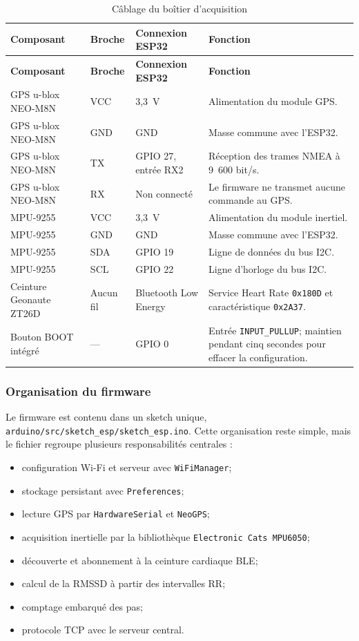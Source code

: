 \documentclass[11pt,a4paper]{article}
\newcommand{\code}[1]{\nolinkurl{#1}}
\begin{document}
\begin{longtable}{L{3.7cm}L{2.7cm}L{4.2cm}L{5.4cm}}
\caption{Câblage du boîtier d'acquisition}\label{tab:cablage-esp32}\\
\toprule
\textbf{Composant} & \textbf{Broche} & \textbf{Connexion ESP32} & \textbf{Fonction} \\
\midrule
\endfirsthead
\toprule
\textbf{Composant} & \textbf{Broche} & \textbf{Connexion ESP32} & \textbf{Fonction} \\
\midrule
\endhead
GPS u-blox NEO-M8N & VCC & 3,3~V & Alimentation du module GPS. \\
GPS u-blox NEO-M8N & GND & GND & Masse commune avec l'ESP32. \\
GPS u-blox NEO-M8N & TX & GPIO 27, entrée RX2 & Réception des trames NMEA à 9~600 bit/s. \\
GPS u-blox NEO-M8N & RX & Non connecté & Le firmware ne transmet aucune commande au GPS. \\
MPU-9255 & VCC & 3,3~V & Alimentation du module inertiel. \\
MPU-9255 & GND & GND & Masse commune avec l'ESP32. \\
MPU-9255 & SDA & GPIO 19 & Ligne de données du bus I2C. \\
MPU-9255 & SCL & GPIO 22 & Ligne d'horloge du bus I2C. \\
Ceinture Geonaute ZT26D & Aucun fil & Bluetooth Low Energy & Service Heart Rate \code{0x180D} et caractéristique \code{0x2A37}. \\
Bouton BOOT intégré & --- & GPIO 0 & Entrée \code{INPUT\_PULLUP}; maintien pendant cinq secondes pour effacer la configuration. \\
\bottomrule
\end{longtable}

\subsubsection{Organisation du firmware}

Le firmware est contenu dans un sketch unique, \code{arduino/src/sketch_esp/sketch_esp.ino}. Cette organisation reste simple, mais le fichier regroupe plusieurs responsabilités centrales :

\begin{itemize}
  \item configuration Wi-Fi et serveur avec \code{WiFiManager};
  \item stockage persistant avec \code{Preferences};
  \item lecture GPS par \code{HardwareSerial} et \code{NeoGPS};
  \item acquisition inertielle par la bibliothèque \code{Electronic Cats MPU6050};
  \item découverte et abonnement à la ceinture cardiaque BLE;
  \item calcul de la RMSSD à partir des intervalles RR;
  \item comptage embarqué des pas;
  \item protocole TCP avec le serveur central.
\end{itemize}
\end{document}

